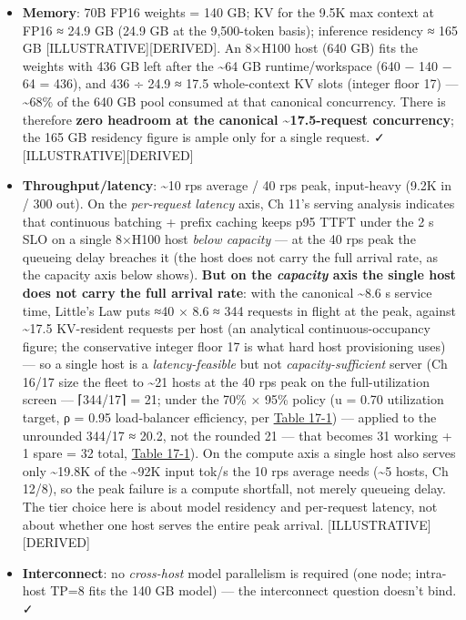 \begin{itemize}
\item
  \textbf{Memory}: 70B FP16 weights = 140 GB; KV for the 9.5K max
  context at FP16 ≈ 24.9 GB (24.9 GB at the 9,500-token basis);
  inference residency ≈ 165 GB \mbox{{[}ILLUSTRATIVE{]}}\hspace{0pt}\mbox{{[}DERIVED{]}}. An
  8×H100 host (640 GB) fits the weights with 436 GB left after the
  \textasciitilde64 GB runtime/workspace (640 − 140 − 64 = 436), and 436
  ÷ 24.9 ≈ 17.5 whole-context KV slots (integer floor 17) ---
  \textasciitilde68\% of the 640 GB pool consumed at that canonical
  concurrency. There is therefore \textbf{zero headroom at the canonical
  \textasciitilde17.5-request concurrency}; the 165 GB residency figure
  is ample only for a single request. ✓ \mbox{{[}ILLUSTRATIVE{]}}\hspace{0pt}\mbox{{[}DERIVED{]}}
\item
  \textbf{Throughput/latency}: \textasciitilde10 rps average / 40 rps
  peak, input-heavy (9.2K in / 300 out). On the \emph{per-request
  latency} axis, Ch 11's serving analysis indicates that continuous
  batching + prefix caching keeps p95 TTFT under the 2 s SLO on a single
  8×H100 host \emph{below capacity} --- at the 40 rps peak the queueing
  delay breaches it (the host does not carry the full arrival rate, as
  the capacity axis below shows). \textbf{But on the \emph{capacity}
  axis the single host does not carry the full arrival rate}: with the
  canonical \textasciitilde8.6 s service time, Little's Law puts ≈40 ×
  8.6 ≈ 344 requests in flight at the peak, against \textasciitilde17.5
  KV-resident requests per host (an analytical continuous-occupancy
  figure; the conservative integer floor 17 is what hard host
  provisioning uses) --- so a single host is a \emph{latency-feasible}
  but not \emph{capacity-sufficient} server (Ch 16/17 size the fleet to
  \textasciitilde21 hosts at the 40 rps peak on the full-utilization
  screen --- ⌈344/17⌉ = 21; under the 70\% × 95\% policy (u = 0.70
  utilization target, ρ = 0.95 load-balancer efficiency, per \hyperref[tab:17.1]{Table 17-1})
  --- applied to the unrounded 344/17 ≈ 20.2, not the rounded 21 ---
  that becomes 31 working + 1 spare = 32 total, \hyperref[tab:17.1]{Table 17-1}). On the
  compute axis a single host also serves only \textasciitilde19.8K of
  the \textasciitilde92K input tok/s the 10 rps average needs
  (\textasciitilde5 hosts, Ch 12/8), so the peak failure is a compute
  shortfall, not merely queueing delay. The tier choice here is about
  model residency and per-request latency, not about whether one host
  serves the entire peak arrival. \mbox{{[}ILLUSTRATIVE{]}}\hspace{0pt}\mbox{{[}DERIVED{]}}
\item
  \textbf{Interconnect}: no \emph{cross-host} model parallelism is
  required (one node; intra-host TP=8 fits the 140 GB model) --- the
  interconnect question doesn't bind. ✓
\end{itemize}

